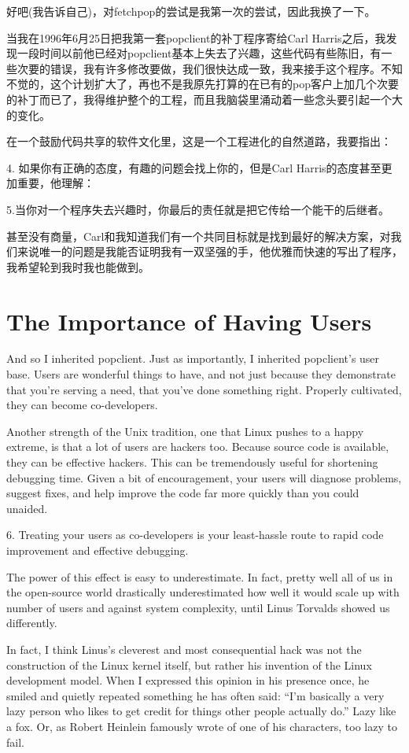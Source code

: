 \documentclass[a4paper,12pt,UTF8,twoside]{ctexbook}
\begin{document}
好吧(我告诉自己)，对fetchpop的尝试是我第一次的尝试，因此我换了一下。


当我在1996年6月25日把我第一套popclient的补丁程序寄给Carl Harris之后，我发现一段时间以前他已经对popclient基本上失去了兴趣，这些代码有些陈旧，有一些次要的错误，我有许多修改要做，我们很快达成一致，我来接手这个程序。不知不觉的，这个计划扩大了，再也不是我原先打算的在已有的pop客户上加几个次要的补丁而已了，我得维护整个的工程，而且我脑袋里涌动着一些念头要引起一个大的变化。


在一个鼓励代码共享的软件文化里，这是一个工程进化的自然道路，我要指出：

4. 如果你有正确的态度，有趣的问题会找上你的，但是Carl Harris的态度甚至更加重要，他理解：

5.当你对一个程序失去兴趣时，你最后的责任就是把它传给一个能干的后继者。


甚至没有商量，Carl和我知道我们有一个共同目标就是找到最好的解决方案，对我们来说唯一的问题是我能否证明我有一双坚强的手，他优雅而快速的写出了程序，我希望轮到我时我也能做到。

\chapter{The Importance of Having Users}

And so I inherited popclient. Just as importantly, I inherited popclient's user base. Users are wonderful things to have, and not just because they demonstrate that you're serving a need, that you've done something right. Properly cultivated, they can become co-developers.

Another strength of the Unix tradition, one that Linux pushes to a happy extreme, is that a lot of users are hackers too. Because source code is available, they can be effective hackers. This can be tremendously useful for shortening debugging time. Given a bit of encouragement, your users will diagnose problems, suggest fixes, and help improve the code far more quickly than you could unaided.

6. Treating your users as co-developers is your least-hassle route to rapid code improvement and effective debugging.

The power of this effect is easy to underestimate. In fact, pretty well all of us in the open-source world drastically underestimated how well it would scale up with number of users and against system complexity, until Linus Torvalds showed us differently.

In fact, I think Linus's cleverest and most consequential hack was not the construction of the Linux kernel itself, but rather his invention of the Linux development model. When I expressed this opinion in his presence once, he smiled and quietly repeated something he has often said: ``I'm basically a very lazy person who likes to get credit for things other people actually do.'' Lazy like a fox. Or, as Robert Heinlein famously wrote of one of his characters, too lazy to fail.
\end{document}
